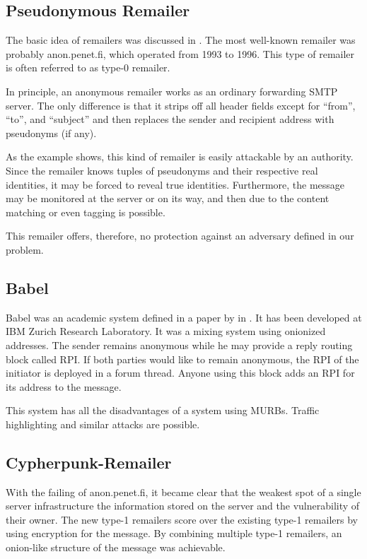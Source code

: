 \subsection{Pseudonymous Remailer\label{sec:remPseudo}}
The basic idea of remailers was discussed in \cite{CHAUM1}. The most well-known remailer was probably anon.penet.fi, which operated from 1993 to 1996. This type of remailer is often referred to as type-0 remailer.

In principle, an anonymous remailer works as an ordinary forwarding SMTP server. The only difference is that it strips off all header fields except for ``from'', ``to'', and ``subject'' and then replaces the sender and recipient address with pseudonyms (if any). 

As the example shows, this kind of remailer is easily attackable by an authority. Since the remailer knows tuples of pseudonyms and their respective real identities, it may be forced to reveal true identities. Furthermore, the message may be monitored at the server or on its way, and then due to the content matching or even tagging is possible.

This remailer offers, therefore, no protection against an adversary defined in our problem.

\subsection{Babel}
Babel was an academic system defined in a paper by \citeauthor{babel} in \citeyear{babel}\cite{babel}. It has been developed at IBM Zurich Research Laboratory. It was a mixing system using onionized addresses. The sender remains anonymous while he may provide a reply routing block called RPI. If both parties would like to remain anonymous, the RPI of the initiator is deployed in a forum thread. Anyone using this block adds an RPI for its address to the message.

This system has all the disadvantages of a system using MURBs. Traffic highlighting and similar attacks are possible.

\subsection{Cypherpunk-Remailer\label{sec:remCypherpunk}}
With the failing of anon.penet.fi, it became clear that the weakest spot of a single server infrastructure the information stored on the server and the vulnerability of their owner. The new type-1 remailers score over the existing type-1 remailers by using encryption for the message. By combining multiple type-1 remailers, an onion-like structure of the message was achievable. 

